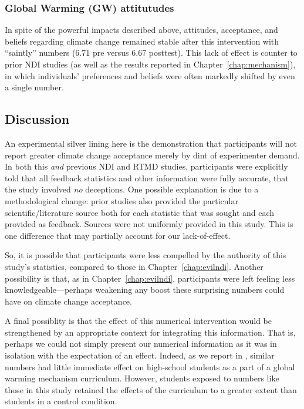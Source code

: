 \subsubsection{Global Warming (GW) attitutudes}

In spite of the powerful impacts described above, attitudes, acceptance, and
beliefs regarding climate change remained stable after this intervention with
“saintly” numbers (6.71 pre versus 6.67 posttest).  This lack of effect is
counter to prior NDI studies (as well as the results reported in
Chapter~\ref{chap:mechanism}), in which individuals’ preferences and beliefs
were often markedly shifted by even a single number. 

\subsection{Discussion}


An experimental silver lining here is the demonstration that participants will
not report greater climate change acceptance merely by dint of experimenter
demand.  In both this \emph{and} previous NDI and RTMD studies, participants
were explicitly told that all feedback statistics and other information were
fully accurate, that the study involved \emph{no} deceptions.  One possible
explanation is due to a methodological change: prior studies 
also provided the particular scientific/literature source both
for each statistic that was sought and each provided as feedback.
Sources were not uniformly provided in this study. This is one
difference that may partially account for our lack-of-effect.

So, it is possible that participants were less compelled by the authority of
this study’s statistics, compared to those in Chapter~\ref{chap:evilndi}.
Another possibility is that, as in Chapter~\ref{chap:evilndi}, participants were
left feeling less knowledgeable---perhaps weakening any boost these surprising numbers
could have on climate change acceptance.  

A final possiblity is that the effect of this numerical intervention would be
strengthened by an appropriate context for integrating this information. That
is, perhaps we could not simply present our numerical information as it was in
isolation with the expectation of an effect. Indeed, as we report in
\parencite{clark_knowledge_inpress}, similar numbers had little immediate effect on
high-school students as a part of a global warming mechanism curriculum.
However, students exposed to numbers like those in this study retained the
effects of the curriculum to a greater extent than students in a control
condition.


